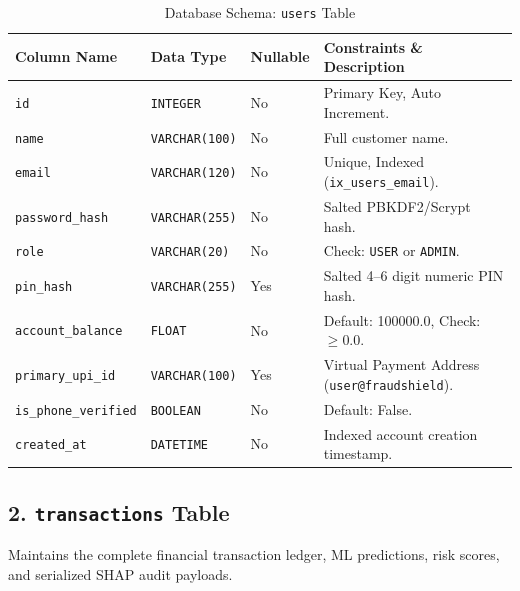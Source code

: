 \begin{table}[h]
\centering
\caption{Database Schema: \texttt{users} Table}
\label{tab:users_schema}
\begin{tabularx}{\textwidth}{lp{2.8cm}p{1.8cm}X}
\toprule
\textbf{Column Name} & \textbf{Data Type} & \textbf{Nullable} & \textbf{Constraints \& Description} \\
\midrule
\texttt{id} & \texttt{INTEGER} & No & Primary Key, Auto Increment. \\
\texttt{name} & \texttt{VARCHAR(100)} & No & Full customer name. \\
\texttt{email} & \texttt{VARCHAR(120)} & No & Unique, Indexed (\texttt{ix\_users\_email}). \\
\texttt{password\_hash} & \texttt{VARCHAR(255)} & No & Salted PBKDF2/Scrypt hash. \\
\texttt{role} & \texttt{VARCHAR(20)} & No & Check: \texttt{USER} or \texttt{ADMIN}. \\
\texttt{pin\_hash} & \texttt{VARCHAR(255)} & Yes & Salted 4--6 digit numeric PIN hash. \\
\texttt{account\_balance} & \texttt{FLOAT} & No & Default: 100000.0, Check: $\ge 0.0$. \\
\texttt{primary\_upi\_id} & \texttt{VARCHAR(100)} & Yes & Virtual Payment Address (\texttt{user@fraudshield}). \\
\texttt{is\_phone\_verified} & \texttt{BOOLEAN} & No & Default: False. \\
\texttt{created\_at} & \texttt{DATETIME} & No & Indexed account creation timestamp. \\
\bottomrule
\end{tabularx}
\end{table}

\subsection{2. \texttt{transactions} Table}
Maintains the complete financial transaction ledger, ML predictions, risk scores, and serialized SHAP audit payloads.

